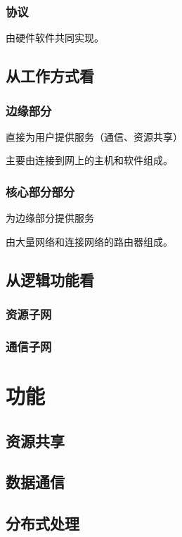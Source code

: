 \subsubsection{协议}
由硬件软件共同实现。


\subsection{从工作方式看}

\subsubsection{边缘部分}
直接为用户提供服务（通信、资源共享）

主要由连接到网上的主机和软件组成。


\subsubsection{核心部分部分}
为边缘部分提供服务

由大量网络和连接网络的路由器组成。


\subsection{从逻辑功能看}

\subsubsection{资源子网}


\subsubsection{通信子网}


\section{功能}

\subsection{资源共享}


\subsection{数据通信}


\subsection{分布式处理}


